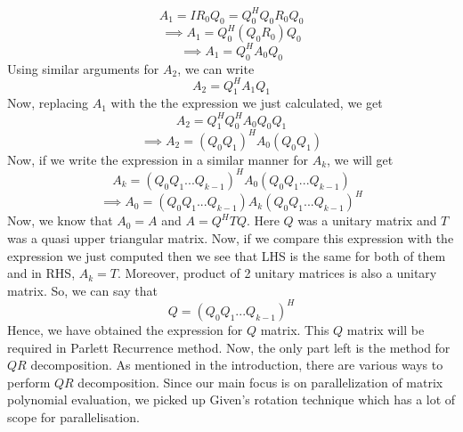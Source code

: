 \documentclass[12pt,a4paper]{article}
\begin{document}
$$A_{1} = IR_{0}Q_{0} = Q_{0}^{H}Q_{0}R_{0}Q_{0}$$
$$\implies A_{1} = Q_{0}^{H}(Q_{0}R_{0})Q_{0}$$
$$\implies A_{1} = Q_{0}^{H}A_{0}Q_{0}$$
Using similar arguments for $A_{2}$, we can write
$$A_{2} = Q_{1}^{H}A_{1}Q_{1}$$
\newpage
Now, replacing $A_{1}$ with the the expression we just calculated, we get
$$A_{2} = Q_{1}^{H}Q_{0}^{H}A_{0}Q_{0}Q_{1}$$
$$\implies A_{2} = (Q_{0}Q_{1})^{H}A_{0}(Q_{0}Q_{1})$$
Now, if we write the expression in a similar manner for $A_{k}$, we will get
$$A_{k} = (Q_{0}Q_{1}...Q_{k-1})^{H}A_{0}(Q_{0}Q_{1}...Q_{k-1})$$
$$\implies A_{0} = (Q_{0}Q_{1}...Q_{k-1})A_{k}(Q_{0}Q_{1}...Q_{k-1})^{H}$$
Now, we know that $A_{0} = A$ and $A = Q^{H}TQ$. Here $Q$ was a unitary matrix and $T$ was a quasi upper triangular matrix. Now, if we compare this expression with the expression we just computed then we see that LHS is the same for both of them and in RHS, $A_{k} = T$. Moreover, product of 2 unitary matrices is also a unitary matrix. So, we can say that 
$$Q = (Q_{0}Q_{1}...Q_{k-1})^{H}$$
Hence, we have obtained the expression for $Q$ matrix. This $Q$ matrix will be required in Parlett Recurrence method. Now, the only part left is the method for $QR$ decomposition. As mentioned in the introduction, there are various ways to perform $QR$ decomposition. Since our main focus is on parallelization of matrix polynomial evaluation, we picked up Given's rotation technique which has a lot of scope for parallelisation. 
\end{document}

